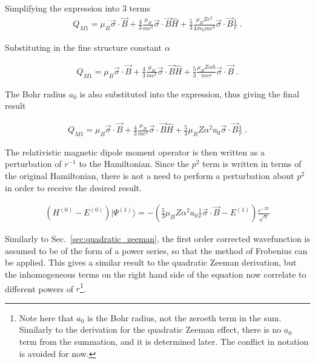             \noindent Simplifying the expression into 3 terms 
            \begin{align}
                Q_{M1} = \mu_B \vec{\sigma} \cdot \vec{B} + \frac{4}{3}\frac{\mu_B}{mc^2}\vec{\sigma} \cdot \vec{B} \hat{H} + \frac{5}{3}\frac{\mu_B Ze^2}{4\pi \epsilon_0 mc^2}\vec{\sigma} \cdot \vec{B} \frac{1}{r}\;.
            \end{align}

            \noindent Substituting in the fine structure constant $\alpha$ 

            \begin{align}
                Q_{M1} = \mu_B \vec{\sigma} \cdot \vec{B} + \frac{4}{3}\frac{\mu_B}{mc^2}\vec{\sigma} \cdot \vec{B} \hat{H} + \frac{5}{3}\frac{\mu_B Z \alpha \hbar}{mcr}\vec{\sigma} \cdot \vec{B} \;.
            \end{align}

            \noindent The Bohr radius $a_0$ is also substituted into the expression, thus giving the final result

            \begin{align}
                Q_{M1} = \mu_B \vec{\sigma} \cdot \vec{B} + \frac{4}{3}\frac{\mu_B}{mc^2}\vec{\sigma} \cdot \vec{B} \hat{H} + \frac{5}{3}\mu_B Z \alpha^2 a_0 \vec{\sigma} \cdot \vec{B} \frac{1}{r} \;.
            \end{align}

            \noindent The relativistic magnetic dipole moment operator is then written as a perturbation of $r^{-1}$ to the Hamiltonian. Since the $p^2$ term is written in terms of the original Hamiltonian, there is not a need to perform a perturbation about $p^2$ in order to receive the desired result.


            \begin{align}
                \left(H^{(0)} - E^{(0)}\right) \vert \varPsi^{(1)}\rangle = -\left(\frac{5}{3}\mu_B Z \alpha^2 a_0 \frac{1}{r} \vec{\sigma} \cdot \vec{B} - E^{(1)} \right) \frac{e^{-Zr}}{\sqrt{\pi}}
            \end{align}

            \noindent Similarly to Sec.~\ref{sec:quadratic_zeeman}, the first order corrected wavefunction is assumed to be of the form of a power series, so that the method of Frobenius can be applied. This gives a similar result to the quadratic Zeeman derivation, but the inhomogeneous terms on the right hand side of the equation now correlate to different powers of $r$\footnote{Note here that $a_0$ is the Bohr radius, not the zeroeth term in the sum. Similarly to the derivation for the quadratic Zeeman effect, there is no $a_0$ term from the summation, and it is determined later. The conflict in notation is avoided for now.}.

